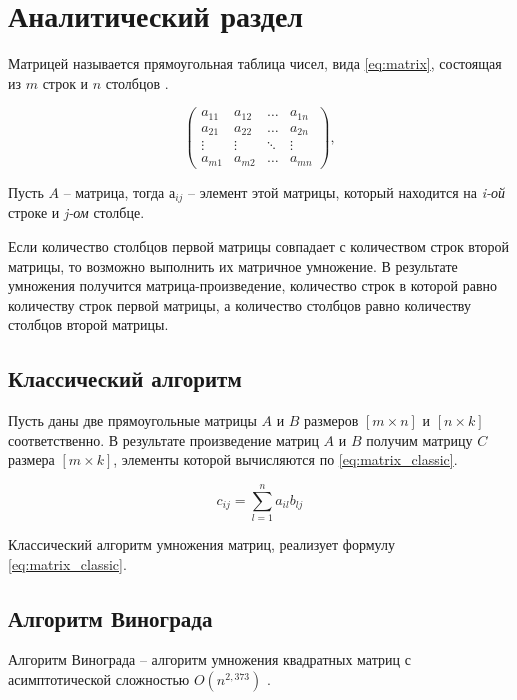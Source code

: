 \chapter{Аналитический раздел}

Матрицей называется прямоугольная таблица чисел, вида \eqref{eq:matrix}, состоящая из $m$ строк и $n$ столбцов \cite{matrix}.

\begin{equation}
	\label{eq:matrix}
	\begin{pmatrix}
		a_{11} & a_{12} & \ldots & a_{1n}\\
		a_{21} & a_{22} & \ldots & a_{2n}\\
		\vdots & \vdots & \ddots & \vdots\\
		a_{m1} & a_{m2} & \ldots & a_{mn}
	\end{pmatrix},
\end{equation}

Пусть $A$ -- матрица, тогда $а_{ij}$ -- элемент этой матрицы, который находится на \textit{i-ой} строке и \textit{j-ом} столбце.

Если количество столбцов первой матрицы совпадает с количеством строк второй матрицы, то возможно выполнить их матричное умножение. В результате умножения получится матрица-произведение, количество строк в которой равно количеству строк первой матрицы, а количество столбцов равно количеству столбцов второй матрицы.

\section{Классический алгоритм}

Пусть даны две прямоугольные матрицы $A$ и $B$ размеров $[m \times n]$ и $[n \times k]$ соответственно. В результате произведение матриц $A$ и $B$ получим матрицу $C$ размера $[m \times k]$, элементы которой вычисляются по \eqref{eq:matrix_classic}.

\begin{equation}
	\label{eq:matrix_classic}
	c_{ij} = \sum_{l=1}^{n}a_{il}b_{lj}
\end{equation}

Классический алгоритм умножения матриц, реализует формулу \eqref{eq:matrix_classic}.

\section{Алгоритм Винограда}

Алгоритм Винограда -- алгоритм умножения квадратных матриц с асимптотической сложностью $O(n^{2,373})$ \cite{book_vinograd}.

